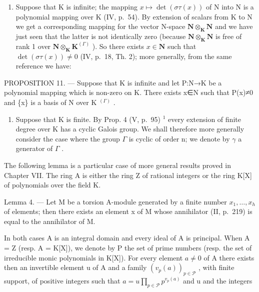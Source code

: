 \begin{enumerate}
\def\labelenumi{\Alph{enumi})}
\tightlist
\item
  Suppose that K is infinite; the mapping \(x \mapsto \det(\sigma\tau(x))\) of N into N is a polynomial mapping over K (IV, p.~54). By extension of scalars from K to N we get a corresponding mapping for the vector N-space \(\mathbf{N} \otimes_{\mathbf{K}} \mathbf{N}\) and we have just seen that the latter is not identically zero (because \(\mathbf{N} \otimes_{\mathbf{K}} \mathbf{N}\) is free of rank 1 over \(\mathbf{N} \otimes_{\mathbf{K}} \mathbf{K}^{(\Gamma)}\) ). So there exists \(x \in \mathbf{N}\) such that \(\det(\sigma\tau(x)) \neq 0\) (IV, p.~18, Th. 2); more generally, from the same reference we have:
\end{enumerate}

PROPOSITION 11. --- Suppose that K is infinite and let P:N→K be a polynomial mapping which is non-zero on K. There exists x∈N such that P(x)≠0 and \{x\} is a basis of N over K \(^{(\Gamma)}\) .

\begin{enumerate}
\def\labelenumi{\Alph{enumi})}
\setcounter{enumi}{1}
\tightlist
\item
  Suppose that K is finite. By Prop. 4 (V, p.~95) \(^{1}\) every extension of finite degree over K has a cyclic Galois group. We shall therefore more generally consider the case where the group \(\Gamma\) is cyclic of order n; we denote by \(\gamma\) a generator of \(\Gamma\) .
\end{enumerate}

The following lemma is a particular case of more general results proved in Chapter VII. The ring A is either the ring Z of rational integers or the ring K{[}X{]} of polynomials over the field K.

Lemma 4. --- Let M be a torsion A-module generated by a finite number \(x_{1}, \ldots, x_{h}\) of elements; then there exists an element x of M whose annihilator (II, p.~219) is equal to the annihilator of M.

In both cases A is an integral domain and every ideal of A is principal. When A = Z (resp. A = K{[}X{]}), we denote by P the set of prime numbers (resp. the set of irreducible monic polynomials in K{[}X{]}). For every element \(a \neq 0\) of A there exists then an invertible element u of A and a family \((v_{p}(a))_{p \in \mathcal{P}}\) , with finite support, of positive integers such that \(a = u \prod_{p \in \mathcal{P}} p^{v_{p}(a)}\) and u and the integers

